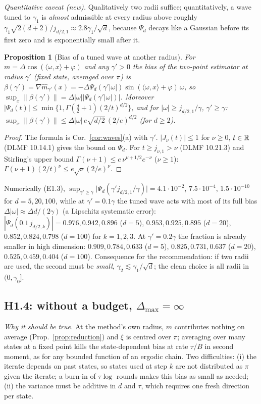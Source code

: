 \documentclass[11pt,a4paper]{article}
\numberwithin{equation}{section}
\newtheorem{proposition}[theorem]{Proposition}
\theoremstyle{definition}
\theoremstyle{remark}
\newcommand{\norm}[1]{\lVert #1\rVert}\newcommand{\abs}[1]{\lvert #1\rvert}\newcommand{\ip}[2]{\langle #1,#2\rangle}
\newcommand{\Dmax}{\Delta_{\max}}\newcommand{\Dcp}{\Delta_{\rm cp}}
\begin{document}
\emph{Quantitative caveat (new).} Qualitatively two radii suffice; quantitatively, a wave tuned to $\gamma_1$ is \emph{almost} admissible at every radius above roughly $\gamma_1\sqrt{2(d+2)}/j_{d/2,1}\approx2.8\gamma_1/\sqrt d$, because $\Psi_d$ decays like a Gaussian before its first zero and is exponentially small after it.
\begin{proposition}[Bias of a tuned wave at another radius]\label{prop:quant}
For $m=\Delta\cos(\ip\omega x+\varphi)$ and any $\gamma'>0$ the bias of the two-point estimator at radius $\gamma'$ (fixed state, averaged over $\pi$) is $\beta(\gamma')=\nabla\hat m_{\gamma'}(x)=-\Delta\Psi_d(\gamma'|\omega|)\sin(\ip\omega x+\varphi)\,\omega$, so $\sup_x\norm{\beta(\gamma')}=\Delta|\omega|\abs{\Psi_d(\gamma'|\omega|)}$. Moreover $\abs{\Psi_d(t)}\le\min\{1,\Gamma(\frac d2+1)(2/t)^{d/2}\}$, and for $|\omega|\ge j_{d/2,1}/\gamma$, $\gamma'\ge\gamma$:
$\sup_x\norm{\beta(\gamma')}\le\Delta|\omega|\,e\sqrt{d/2}\,(2/e)^{d/2}$ (for $d\ge2$).
\end{proposition}
\begin{proof}
The formula is Cor.~\ref{cor:waves}(a) with $\gamma'$. $\abs{J_\nu(t)}\le1$ for $\nu\ge0$, $t\in\mathbb R$ (DLMF 10.14.1) gives the bound on $\Psi_d$. For $t\ge j_{\nu,1}>\nu$ (DLMF 10.21.3) and Stirling's upper bound $\Gamma(\nu+1)\le e\,\nu^{\nu+1/2}e^{-\nu}$ ($\nu\ge1$): $\Gamma(\nu+1)(2/t)^\nu\le e\sqrt\nu(2/e)^\nu$.
\end{proof}
Numerically (E1.3), $\sup_{\gamma'\ge\gamma}\abs{\Psi_d(\gamma'j_{d/2,1}/\gamma)}=4.1\cdot10^{-2}$, $7.5\cdot10^{-4}$, $1.5\cdot10^{-10}$ for $d=5,20,100$, while at $\gamma'=0.1\gamma$ the tuned wave acts with most of its full bias $\Delta|\omega|\approx\Delta d/(2\gamma)$ (a Lipschitz systematic error): $|\Psi_d(0.1\,j_{d/2,k})|=0.976,0.942,0.896$ ($d=5$), $0.953,0.925,0.895$ ($d=20$), $0.852,0.824,0.798$ ($d=100$) for $k=1,2,3$. At $\gamma'=0.2\gamma$ the fraction is already smaller in high dimension: $0.909,0.784,0.633$ ($d=5$), $0.825,0.731,0.637$ ($d=20$), $0.525,0.459,0.404$ ($d=100$). Consequence for the recommendation: if two radii are used, the second must be \emph{small}, $\gamma_2\lesssim\gamma_1/\sqrt d$; the clean choice is all radii in $(0,\gamma_0]$.

\subsection{H1.4: without a budget, $\Dmax=\infty$}
\emph{Why it should be true.} At the method's own radius, $m$ contributes nothing on average (Prop.~\ref{prop:reduction}) and $\xi$ is centred over $\pi$; averaging over many states at a fixed point kills the state-dependent bias at rate $\tau/B$ in second moment, as for any bounded function of an ergodic chain. Two difficulties: (i) the iterate depends on past states, so states used at step $k$ are not distributed as $\pi$ given the iterate; a burn-in of $\tau\log$ rounds makes this bias as small as needed; (ii) the variance must be additive in $d$ and $\tau$, which requires one fresh direction per state.
\end{document}
